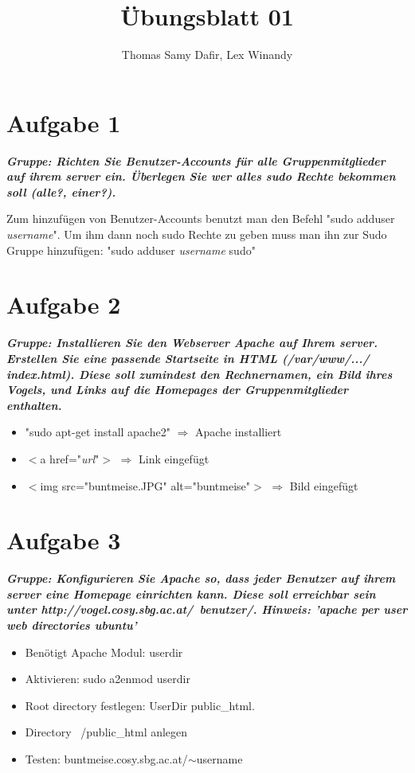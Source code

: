 \documentclass[12pt, a4paper]{report}
\title{Übungsblatt 01}
\author{Thomas Samy Dafir, Lex Winandy}
\date{}
\begin{document}
\maketitle

\section*{Aufgabe 1}
\textbf{\textit{Gruppe: Richten Sie Benutzer-Accounts für alle Gruppenmitglieder auf ihrem server ein. Überlegen Sie wer alles sudo Rechte bekommen soll (alle?, einer?).}}

Zum hinzufügen von Benutzer-Accounts benutzt man den Befehl "sudo adduser \textit{username}". Um ihm dann noch sudo Rechte zu geben muss man ihn zur Sudo Gruppe hinzufügen: "sudo adduser \textit{username} sudo"
\section*{Aufgabe 2}
\textbf{\textit{Gruppe: Installieren Sie den Webserver Apache auf Ihrem server. Erstellen Sie eine passende Startseite in HTML (/var/www/.../ index.html). Diese soll zumindest den Rechnernamen, ein Bild ihres Vogels, und Links auf die Homepages der Gruppenmitglieder enthalten.}}
\begin{itemize}
	\item "sudo apt-get install apache2" $\Rightarrow$ Apache installiert
	\item $<$a href="\textit{url}"$>$ $\Rightarrow$ Link eingefügt
	\item $<$img src="buntmeise.JPG" alt="buntmeise"$>$ $\Rightarrow$ Bild eingefügt
\end{itemize}

\section*{Aufgabe 3}
\textbf{\textit{Gruppe: Konfigurieren Sie Apache so, dass jeder Benutzer auf ihrem server eine Homepage einrichten kann. Diese soll erreichbar sein unter http://vogel.cosy.sbg.ac.at/~benutzer/.
Hinweis: ’apache per user web directories ubuntu’}}

\begin{itemize}
	\item Benötigt Apache Modul: userdir
	\item Aktivieren: sudo a2enmod userdir
	\item Root directory festlegen: UserDir public\_html.
	\item Directory ~/public\_html anlegen
	\item Testen: buntmeise.cosy.sbg.ac.at/$\sim$username
\end{itemize}
\end{document}
